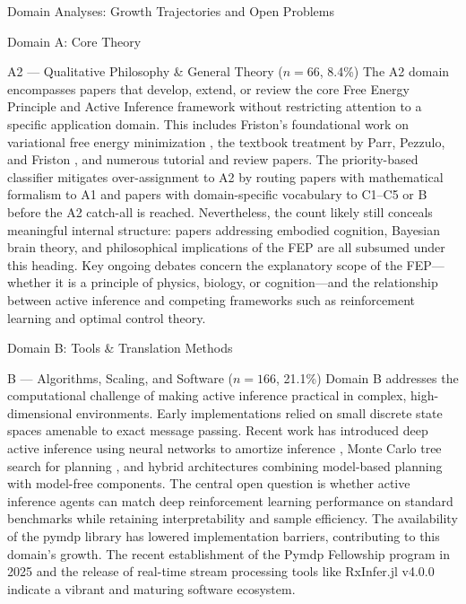 \documentclass[
  ignorenonframetext,
]{beamer}
\begin{document}
\begin{frame}{Domain Analyses: Growth Trajectories and Open Problems
\label{sec:subfield_analyses}}
\begin{block}{Domain A: Core Theory}
\begin{block}{A2 --- Qualitative Philosophy \& General Theory
(\(n = 66\), 8.4\%)}
\protect{}\label{a2-qualitative-philosophy-general-theory-n-66-8.4}
The A2 domain encompasses papers that develop, extend, or review the
core Free Energy Principle and Active Inference framework without
restricting attention to a specific application domain. This includes
Friston's foundational work on variational free energy minimization
\citep{friston2010free}, the textbook treatment by Parr, Pezzulo, and
Friston \citep{parr2022active}, and numerous tutorial and review papers.
The priority-based classifier mitigates over-assignment to A2 by routing
papers with mathematical formalism to A1 and papers with domain-specific
vocabulary to C1--C5 or B before the A2 catch-all is reached.
Nevertheless, the count likely still conceals meaningful internal
structure: papers addressing embodied cognition, Bayesian brain theory,
and philosophical implications of the FEP are all subsumed under this
heading. Key ongoing debates concern the explanatory scope of the
FEP---whether it is a principle of physics, biology, or cognition---and
the relationship between active inference and competing frameworks such
as reinforcement learning and optimal control theory.
\end{block}
\end{block}

\begin{block}{Domain B: Tools \& Translation Methods}
\protect{}\label{domain-b-tools-translation-methods}
\begin{block}{B --- Algorithms, Scaling, and Software (\(n = 166\),
21.1\%)}
\protect{}\label{b-algorithms-scaling-and-software-n-166-21.1}
Domain B addresses the computational challenge of making active
inference practical in complex, high-dimensional environments. Early
implementations relied on small discrete state spaces amenable to exact
message passing. Recent work has introduced deep active inference using
neural networks to amortize inference \citep{fountas2020deep}, Monte
Carlo tree search for planning \citep{champion2021realizing}, and hybrid
architectures combining model-based planning with model-free components.
The central open question is whether active inference agents can match
deep reinforcement learning performance on standard benchmarks while
retaining interpretability and sample efficiency. The availability of
the pymdp library \citep{heins2022pymdp} has lowered implementation
barriers, contributing to this domain's growth. The recent establishment
of the Pymdp Fellowship program in 2025 and the release of real-time
stream processing tools like RxInfer.jl v4.0.0 \citep{rxinfer2025}
indicate a vibrant and maturing software ecosystem.
\end{block}
\end{block}


\end{frame}
\end{document}
